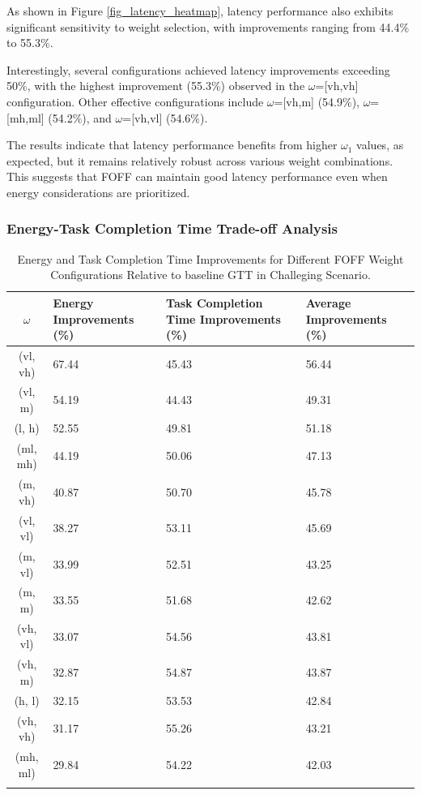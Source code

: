 \documentclass[iicol]{sn-jnl}
\begin{document}
As shown in Figure \ref{fig_latency_heatmap}, latency performance also exhibits significant sensitivity to weight selection, with improvements ranging from 44.4\% to 55.3\%. 

Interestingly, several configurations achieved latency improvements exceeding 50\%, with the highest improvement (55.3\%) observed in the $\omega$=[vh,vh] configuration. Other effective configurations include $\omega$=[vh,m] (54.9\%), $\omega$=[mh,ml] (54.2\%), and $\omega$=[vh,vl] (54.6\%).

The results indicate that latency performance benefits from higher $\omega_1$ values, as expected, but it remains relatively robust across various weight combinations. This suggests that FOFF can maintain good latency performance even when energy considerations are prioritized.

\subsubsection{Energy-Task Completion Time Trade-off Analysis}
\newlength{\fourcolumns}
\setlength{\fourcolumns}{\dimexpr\columnwidth/5\relax} 

\begin{table}[ht!]
    \centering
    \caption{Energy and Task Completion Time Improvements for Different FOFF Weight Configurations Relative to baseline GTT in Challeging Scenario.}
    \label{tab_energy_latency_tradeoff}
    \begin{tabular}{cp{\fourcolumns}p{\fourcolumns}p{\fourcolumns}}
    \toprule
    \textbf{$\omega$} & \textbf{Energy Improvements (\%)} & \textbf{Task Completion Time Improvements (\%)} & \textbf{Average Improvements (\%)} \\
    \midrule
    (vl, vh) & 67.44 & 45.43 & 56.44 \\
    (vl, m) & 54.19 & 44.43 & 49.31 \\
    (l, h) & 52.55 & 49.81 & 51.18 \\
    (ml, mh) & 44.19 & 50.06 & 47.13 \\
    (m, vh) & 40.87 & 50.70 & 45.78 \\
    (vl, vl) & 38.27 & 53.11 & 45.69 \\
    (m, vl) & 33.99 & 52.51 & 43.25 \\
    (m, m) & 33.55 & 51.68 & 42.62 \\
    (vh, vl) & 33.07 & 54.56 & 43.81 \\
    (vh, m) & 32.87 & 54.87 & 43.87 \\
    (h, l) & 32.15 & 53.53 & 42.84 \\
    (vh, vh) & 31.17 & 55.26 & 43.21 \\
    (mh, ml) & 29.84 & 54.22 & 42.03 \\
    \botrule
    \end{tabular}
    \end{table}
\end{document}
